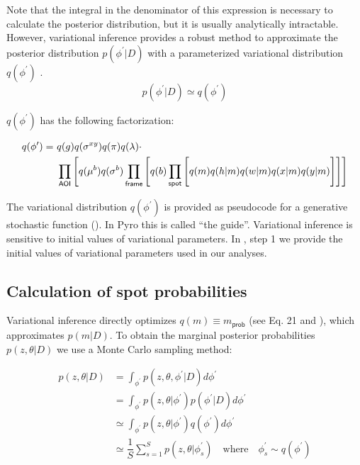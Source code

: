 Note that the integral in the denominator of this expression is necessary to calculate the posterior distribution, but it is usually analytically intractable. However, variational inference provides a robust method to approximate the posterior distribution $p(\phi^{\prime} | D)$ with a parameterized variational distribution $q(\phi^{\prime})$ \citep{Bishop2006-oa}.
%
\begin{equation}
    p(\phi^{\prime} | D) \simeq q(\phi^{\prime})
\end{equation}


$q(\phi^{\prime})$ has the following factorization:

\begin{equation}
\begin{aligned}
    q(\phi^{\prime}) =~&q(g) q(\sigma^{xy}) q(\pi) q(\lambda) \cdot \\
    &\prod_{\mathsf{AOI}} \left[ q(\mu^b) q(\sigma^b) \prod_{\mathsf{frame}} \left[ q(b) \prod_{\mathsf{spot}} \left[ \vphantom{\prod_{F}} q(m) q(h | m) q(w | m) q(x | m) q(y | m) \right] \right] \right]
\end{aligned}
\end{equation}

The variational distribution $q(\phi^{\prime})$ is provided as pseudocode for a generative stochastic function (). In Pyro this is called ``the guide''. Variational inference is sensitive to initial values of variational parameters. In , step 1 we provide the initial values of variational parameters used in our analyses.



\subsection{Calculation of spot probabilities}

Variational inference directly optimizes $q(m) \equiv m_\mathsf{prob}$ (see Eq. 21 and ), which approximates $p(m | D)$. To obtain the marginal posterior probabilities $p(z, \theta | D)$ we use a Monte Carlo sampling method:

\begin{equation}
\begin{aligned}
    p(z, \theta | D) &= \int_{\phi^{\prime}} p(z, \theta, \phi^{\prime} | D) d\phi^{\prime} \\
    &=  \int_{\phi^{\prime}} p(z, \theta | \phi^{\prime}) p(\phi^{\prime} | D) d\phi^{\prime} \\
    &\simeq \int_{\phi^{\prime}} p(z, \theta | \phi^{\prime}) q(\phi^{\prime}) d\phi^{\prime} \\
    &\simeq \dfrac{1}{S} \sum_{s=1}^{S} p(z, \theta | \phi^{\prime}_s) \quad \text{where} \quad \phi^{\prime}_s \sim q(\phi^{\prime})
\end{aligned}
\end{equation}

